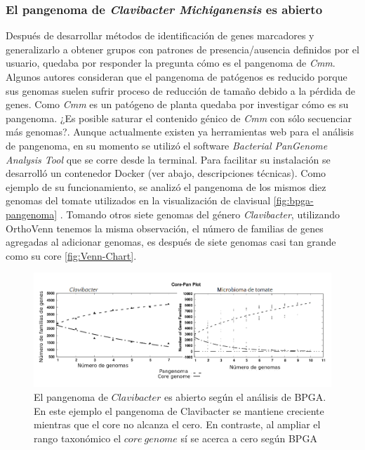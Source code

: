 \documentclass[12pt,twoside]{reedthesis}
\begin{document}
  \subsubsection{\texorpdfstring{El pangenoma de \emph{Clavibacter
  Michiganensis} es
  abierto}{El pangenoma de Clavibacter Michiganensis es abierto}}\label{el-pangenoma-de-clavibacter-michiganensis-es-abierto}
  
  Después de desarrollar métodos de identificación de genes marcadores y
  generalizarlo a obtener grupos con patrones de presencia/ausencia
  definidos por el usuario, quedaba por responder la pregunta cómo es el
  pangenoma de \emph{Cmm}. Algunos autores consideran que el pangenoma de
  patógenos es reducido porque sus genomas suelen sufrir proceso de
  reducción de tamaño debido a la pérdida de genes. Como \emph{Cmm} es un
  patógeno de planta quedaba por investigar cómo es su pangenoma. ¿Es
  posible saturar el contenido génico de \emph{Cmm} con sólo secuenciar
  más genomas?. Aunque actualmente existen ya herramientas web para el
  análisis de pangenoma, en su momento se utilizó el software
  \emph{Bacterial PanGenome Analysis Tool} que se corre desde la terminal.
  Para facilitar su instalación se desarrolló un contenedor Docker (ver
  abajo, descripciones técnicas). Como ejemplo de su funcionamiento, se
  analizó el pangenoma de los mismos diez genomas del tomate utilizados en
  la visualización de clavisual \autoref{fig:bpga-pangenoma} . Tomando
  otros siete genomas del género \emph{Clavibacter}, utilizando OrthoVenn
  tenemos la misma observación, el número de familias de genes agregadas
  al adicionar genomas, es después de siete genomas casi tan grande como
  su core \autoref{fig:Venn-Chart}.
  
  \begin{figure}[h!tbp]
  \centering
  \includegraphics[angle = 0,scale = .5]{chapter1/bpga-pangenoma.png}
  \caption[El pangenoma de $Clavibacter$ es abierto según el análisis de BPGA.]{\footnotesize{El pangenoma de $Clavibacter$ es abierto según el análisis de BPGA. En este ejemplo el pangenoma de Clavibacter se mantiene creciente mientras que el core no alcanza el cero. En contraste, al ampliar el rango taxonómico el $core~genome$ sí se acerca a cero según BPGA}}
  \label{fig:bpga-pangenoma}
  \end{figure}
  
\end{document}
